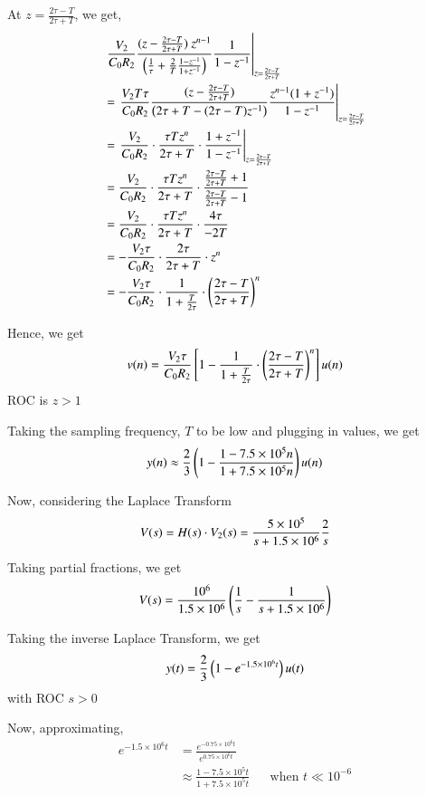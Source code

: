 \documentclass[journal,12pt,twocolumn]{IEEEtran}
\renewcommand\thesection{\arabic{section}}
\begin{document}
\begin{enumerate}[label=\arabic*.,ref=\thesection.\theenumi]
	At \( z = \frac{2\tau - T}{2\tau + T} \), we get,
	\begin{align*}
		& \left. \frac{V_2}{C_0 R_2} \frac{(z-\frac{2\tau - T}{2\tau + T}) \ z^{n-1}}{\left(\frac{1}{\tau} +
		\frac{2}{T} \frac{1-z^{-1}}{1+z^{-1}}\right)} \frac{1}{1 - z^{-1}} \right|_{z=\frac{2\tau - T}{2\tau + T}} \\
		&= \left. \frac{V_2 T\tau}{C_0 R_2} \frac{(z-\frac{2\tau - T}{2\tau + T})}
		{\left(2\tau + T - (2\tau - T)z^{-1}\right)}
		\frac{z^{n-1}(1+z^{-1})}{1 - z^{-1}} \right|_{z=\frac{2\tau - T}{2\tau + T}} \\
		&= \left. \frac{V_2}{C_0 R_2} \cdot \frac{\tau T z^n} {2\tau + T}
		\cdot \frac{1+z^{-1}}{1 - z^{-1}} \right|_{z=\frac{2\tau - T}{2\tau + T}} \\
		&= \frac{V_2}{C_0 R_2} \cdot \frac{\tau T z^n} {2\tau + T}
		\cdot \frac{\frac{2\tau - T}{2\tau + T} + 1}{\frac{2\tau - T}{2\tau + T} - 1} \\
		&= \frac{V_2}{C_0 R_2} \cdot \frac{\tau T z^n} {2\tau + T}
		\cdot \frac{4 \tau}{-2 T} \\
		&= -\frac{V_2 \tau}{C_0 R_2} \cdot \frac{2\tau} {2\tau + T} \cdot z^n \\
		&= -\frac{V_2 \tau}{C_0 R_2} \cdot \frac{1} {1 + \frac{T}{2\tau}} \cdot \left(\frac{2\tau - T}{2\tau + T}\right)^n \\
	\end{align*}

	Hence, we get
	\[
		v(n) = \frac{V_2 \tau}{C_0 R_2} \left[ 1 - \frac{1} {1 + \frac{T}{2\tau}}
		\cdot \left(\frac{2\tau - T}{2\tau + T}\right)^n \right] u(n)
	\]
	ROC is \( z > 1 \)

	Taking the sampling frequency, \( T \) to be low and plugging in values, we get
	\[ y(n) \approx \frac{2}{3} \left(1 - \frac{1-7.5\times10^5 n}{1+7.5\times10^5 n}\right)u(n) \]

	Now, considering the Laplace Transform
	\[ V(s) = H(s) \cdot V_2(s) = \frac{5\times10^5}{s+1.5\times10^6} \frac{2}{s} \\ \]

	Taking partial fractions, we get
	\[ V(s) = \frac{10^6}{1.5\times10^6} \left(\frac{1}{s} - \frac{1}{s+1.5\times10^6}\right) \]

	Taking the inverse Laplace Transform, we get
	\[ y(t) = \frac{2}{3}\left(1 - e^{-1.5\times10^6 t}\right)u(t) \]
	with ROC \( s > 0 \)

	Now, approximating,
	\begin{align*}
		e^{-1.5\times 10^6 t} &= \frac{e^{-0.75 \times 10^6 t}}{e^{0.75 \times 10^6 t}} \\
		&\approx \frac{1-7.5\times10^5 t}{1+7.5\times10^5 t} && \text{when } t \ll 10^{-6}
	\end{align*}


\end{enumerate}
\end{document}
